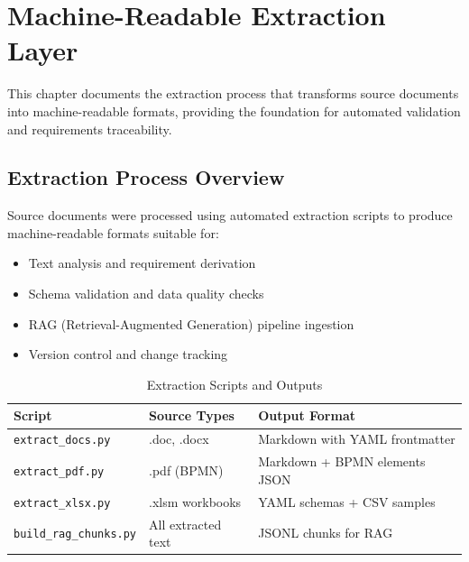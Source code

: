 \chapter{Machine-Readable Extraction Layer}
\label{ch:extraction-layer}

This chapter documents the extraction process that transforms source
documents into machine-readable formats, providing the foundation for
automated validation and requirements traceability.

\section{Extraction Process Overview}
\label{sec:extraction-overview}

Source documents were processed using automated extraction scripts to
produce machine-readable formats suitable for:

\begin{itemize}[noitemsep]
  \item Text analysis and requirement derivation
  \item Schema validation and data quality checks
  \item RAG (Retrieval-Augmented Generation) pipeline ingestion
  \item Version control and change tracking
\end{itemize}

\begin{table}[h]
\centering
\caption{Extraction Scripts and Outputs}
\label{tab:extraction-scripts}
\begin{tabularx}{\textwidth}{@{}L{3.5cm}L{4cm}L{6.5cm}@{}}
\toprule
\textbf{Script} & \textbf{Source Types} & \textbf{Output Format} \\
\midrule
\texttt{extract\_docs.py} & .doc, .docx & Markdown with YAML frontmatter \\
\texttt{extract\_pdf.py} & .pdf (BPMN) & Markdown + BPMN elements JSON \\
\texttt{extract\_xlsx.py} & .xlsm workbooks & YAML schemas + CSV samples \\
\texttt{build\_rag\_chunks.py} & All extracted text & JSONL chunks for RAG \\
\bottomrule
\end{tabularx}
\end{table}

